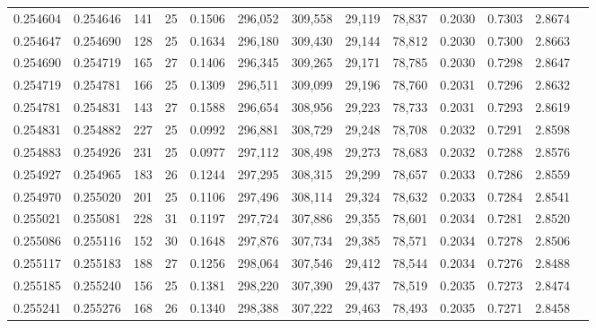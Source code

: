 \begin{tabular}{rrrrrrrrrrrrr}
0.254604 & 0.254646 &   141 &  25 &                                     0.1506 & 296,052 & 309,558 &  29,119 &  78,837 & 0.2030 & 0.7303 & 2.8674 \\
0.254647 & 0.254690 &   128 &  25 &                                     0.1634 & 296,180 & 309,430 &  29,144 &  78,812 & 0.2030 & 0.7300 & 2.8663 \\
0.254690 & 0.254719 &   165 &  27 &                                     0.1406 & 296,345 & 309,265 &  29,171 &  78,785 & 0.2030 & 0.7298 & 2.8647 \\
0.254719 & 0.254781 &   166 &  25 &                                     0.1309 & 296,511 & 309,099 &  29,196 &  78,760 & 0.2031 & 0.7296 & 2.8632 \\
0.254781 & 0.254831 &   143 &  27 &                                     0.1588 & 296,654 & 308,956 &  29,223 &  78,733 & 0.2031 & 0.7293 & 2.8619 \\
0.254831 & 0.254882 &   227 &  25 &                                     0.0992 & 296,881 & 308,729 &  29,248 &  78,708 & 0.2032 & 0.7291 & 2.8598 \\
0.254883 & 0.254926 &   231 &  25 &                                     0.0977 & 297,112 & 308,498 &  29,273 &  78,683 & 0.2032 & 0.7288 & 2.8576 \\
0.254927 & 0.254965 &   183 &  26 &                                     0.1244 & 297,295 & 308,315 &  29,299 &  78,657 & 0.2033 & 0.7286 & 2.8559 \\
0.254970 & 0.255020 &   201 &  25 &                                     0.1106 & 297,496 & 308,114 &  29,324 &  78,632 & 0.2033 & 0.7284 & 2.8541 \\
0.255021 & 0.255081 &   228 &  31 &                                     0.1197 & 297,724 & 307,886 &  29,355 &  78,601 & 0.2034 & 0.7281 & 2.8520 \\
0.255086 & 0.255116 &   152 &  30 &                                     0.1648 & 297,876 & 307,734 &  29,385 &  78,571 & 0.2034 & 0.7278 & 2.8506 \\
0.255117 & 0.255183 &   188 &  27 &                                     0.1256 & 298,064 & 307,546 &  29,412 &  78,544 & 0.2034 & 0.7276 & 2.8488 \\
0.255185 & 0.255240 &   156 &  25 &                                     0.1381 & 298,220 & 307,390 &  29,437 &  78,519 & 0.2035 & 0.7273 & 2.8474 \\
0.255241 & 0.255276 &   168 &  26 &                                     0.1340 & 298,388 & 307,222 &  29,463 &  78,493 & 0.2035 & 0.7271 & 2.8458 \\

\end{tabular}
